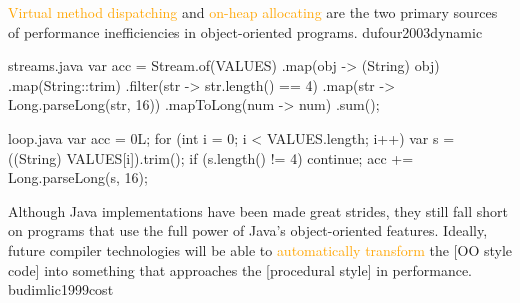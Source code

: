 \documentclass{article}
\newcommand\hlt[1]{\textcolor{orange}{#1}}
\newenvironment{xcode}[1][xcode.txt]
  {\VerbatimEnvironment\begin{VerbatimOut}{#1}}
  {\end{VerbatimOut}}
\begin{document}
  {\hlt{Virtual method dispatching} and \hlt{on-heap allocating} are the two primary sources of performance inefficiencies in object-oriented programs.}
  {dufour2003dynamic}

\begin{xcode}[streams.java]
var acc = Stream.of(VALUES)
  .map(obj -> (String) obj)
  .map(String::trim)
  .filter(str -> str.length() == 4)
  .map(str -> Long.parseLong(str, 16))
  .mapToLong(num -> num)
  .sum();
\end{xcode}
\begin{xcode}[loop.java]
var acc = 0L;
for (int i = 0; i < VALUES.length; i++) {
  var s = ((String) VALUES[i]).trim();
  if (s.length() != 4) continue;
  acc += Long.parseLong(s, 16);
}
\end{xcode}


  {Although Java implementations have been made great strides, they still fall short on programs that use the full power of Java’s object-oriented features. Ideally, future compiler technologies will be able to \hlt{automatically transform} the [OO style code] into something that approaches the [procedural style] in performance.}
  {budimlic1999cost}
\end{document}
